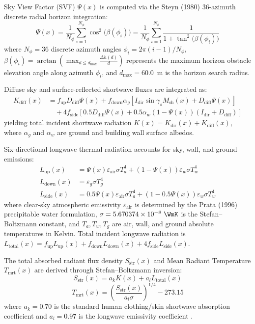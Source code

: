 \documentclass[conference]{IEEEtran}
\newcommand{\Tmrt}{T_{\mathrm{mrt}}}
\begin{document}
Sky View Factor (SVF) $\Psi(x)$ is computed via the Steyn (1980) 36-azimuth discrete radial horizon integration:
\begin{equation}
\Psi(x) = \frac{1}{N_{\phi}} \sum_{i=1}^{N_{\phi}} \cos^2\bigl(\beta(\phi_i)\bigr) = \frac{1}{N_{\phi}} \sum_{i=1}^{N_{\phi}} \frac{1}{1 + \tan^2\bigl(\beta(\phi_i)\bigr)}
\end{equation}
where $N_{\phi} = 36$ discrete azimuth angles $\phi_i = 2\pi(i-1)/N_{\phi}$, $\beta(\phi_i) = \arctan\left(\max_{d \le d_{\max}} \frac{\Delta h(d)}{d}\right)$ represents the maximum horizon obstacle elevation angle along azimuth $\phi_i$, and $d_{\max} = 60.0$~m is the horizon search radius.

Diffuse sky and surface-reflected shortwave fluxes are integrated as:
\begin{align}
K_{\mathrm{diff}}(x) &= f_{\mathrm{up}} D_{\mathrm{diff}} \Psi(x) + f_{\mathrm{down}} \alpha_g \left[I_{\mathrm{dir}}\sin\gamma_s M_{\mathrm{sh}}(x) + D_{\mathrm{diff}}\Psi(x)\right] \nonumber \\
&\quad + 4 f_{\mathrm{side}} \left[ 0.5 D_{\mathrm{diff}}\Psi(x) + 0.5 \alpha_w (1 - \Psi(x))(I_{\mathrm{dir}} + D_{\mathrm{diff}}) \right]
\end{align}
yielding total incident shortwave radiation $K(x) = K_{\mathrm{dir}}(x) + K_{\mathrm{diff}}(x)$, where $\alpha_g$ and $\alpha_w$ are ground and building wall surface albedos.

Six-directional longwave thermal radiation accounts for sky, wall, and ground emissions:
\begin{align}
L_{\mathrm{up}}(x) &= \Psi(x) \varepsilon_{\mathrm{air}} \sigma T_a^4 + (1 - \Psi(x)) \varepsilon_w \sigma T_w^4 \\
L_{\mathrm{down}}(x) &= \varepsilon_g \sigma T_g^4 \\
L_{\mathrm{side}}(x) &= 0.5 \Psi(x) \varepsilon_{\mathrm{air}} \sigma T_a^4 + (1 - 0.5 \Psi(x)) \varepsilon_w \sigma T_w^4
\end{align}
where clear-sky atmospheric emissivity $\varepsilon_{\mathrm{air}}$ is determined by the Prata (1996) precipitable water formulation, $\sigma = 5.670374 \times 10^{-8}~\WmK$ is the Stefan--Boltzmann constant, and $T_a, T_w, T_g$ are air, wall, and ground absolute temperatures in Kelvin. Total incident longwave radiation is $L_{\mathrm{total}}(x) = f_{\mathrm{up}} L_{\mathrm{up}}(x) + f_{\mathrm{down}} L_{\mathrm{down}}(x) + 4 f_{\mathrm{side}} L_{\mathrm{side}}(x)$.

The total absorbed radiant flux density $S_{\mathrm{str}}(x)$ and Mean Radiant Temperature $\Tmrt(x)$ are derived through Stefan--Boltzmann inversion:
\begin{equation}
S_{\mathrm{str}}(x) = a_k K(x) + a_l L_{\mathrm{total}}(x)
\end{equation}
\begin{equation}
T_{\mathrm{mrt}}(x) = \left( \frac{S_{\mathrm{str}}(x)}{a_l \sigma} \right)^{1/4} - 273.15
\end{equation}
where $a_k = 0.70$ is the standard human clothing/skin shortwave absorption coefficient and $a_l = 0.97$ is the longwave emissivity coefficient \cite{lindberg2008solweig}.
\end{document}
